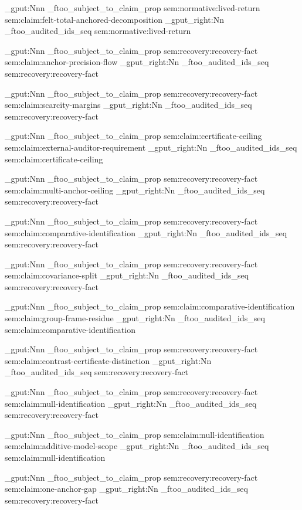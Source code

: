 \prop_gput:Nnn \g_ftoo_subject_to_claim_prop { sem:normative:lived-return } { sem:claim:felt-total-anchored-decomposition }
\seq_gput_right:Nn \g_ftoo_audited_ids_seq { sem:normative:lived-return }

\prop_gput:Nnn \g_ftoo_subject_to_claim_prop { sem:recovery:recovery-fact } { sem:claim:anchor-precision-flow }
\seq_gput_right:Nn \g_ftoo_audited_ids_seq { sem:recovery:recovery-fact }

\prop_gput:Nnn \g_ftoo_subject_to_claim_prop { sem:recovery:recovery-fact } { sem:claim:scarcity-margins }
\seq_gput_right:Nn \g_ftoo_audited_ids_seq { sem:recovery:recovery-fact }

\prop_gput:Nnn \g_ftoo_subject_to_claim_prop { sem:claim:certificate-ceiling } { sem:claim:external-auditor-requirement }
\seq_gput_right:Nn \g_ftoo_audited_ids_seq { sem:claim:certificate-ceiling }

\prop_gput:Nnn \g_ftoo_subject_to_claim_prop { sem:recovery:recovery-fact } { sem:claim:multi-anchor-ceiling }
\seq_gput_right:Nn \g_ftoo_audited_ids_seq { sem:recovery:recovery-fact }

\prop_gput:Nnn \g_ftoo_subject_to_claim_prop { sem:recovery:recovery-fact } { sem:claim:comparative-identification }
\seq_gput_right:Nn \g_ftoo_audited_ids_seq { sem:recovery:recovery-fact }

\prop_gput:Nnn \g_ftoo_subject_to_claim_prop { sem:recovery:recovery-fact } { sem:claim:covariance-split }
\seq_gput_right:Nn \g_ftoo_audited_ids_seq { sem:recovery:recovery-fact }

\prop_gput:Nnn \g_ftoo_subject_to_claim_prop { sem:claim:comparative-identification } { sem:claim:group-frame-residue }
\seq_gput_right:Nn \g_ftoo_audited_ids_seq { sem:claim:comparative-identification }

\prop_gput:Nnn \g_ftoo_subject_to_claim_prop { sem:recovery:recovery-fact } { sem:claim:contrast-certificate-distinction }
\seq_gput_right:Nn \g_ftoo_audited_ids_seq { sem:recovery:recovery-fact }

\prop_gput:Nnn \g_ftoo_subject_to_claim_prop { sem:recovery:recovery-fact } { sem:claim:null-identification }
\seq_gput_right:Nn \g_ftoo_audited_ids_seq { sem:recovery:recovery-fact }

\prop_gput:Nnn \g_ftoo_subject_to_claim_prop { sem:claim:null-identification } { sem:claim:additive-model-scope }
\seq_gput_right:Nn \g_ftoo_audited_ids_seq { sem:claim:null-identification }

\prop_gput:Nnn \g_ftoo_subject_to_claim_prop { sem:recovery:recovery-fact } { sem:claim:one-anchor-gap }
\seq_gput_right:Nn \g_ftoo_audited_ids_seq { sem:recovery:recovery-fact }

